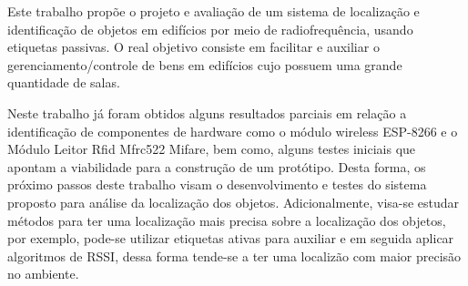 
\label{chapter:consideracoes}

Este trabalho propõe o projeto e avaliação de um sistema de localização e identificação de objetos em edifícios por meio de 
radiofrequência, usando etiquetas passivas. O real objetivo consiste em facilitar e auxiliar o gerenciamento/controle de 
bens em edifícios cujo possuem uma grande quantidade de salas.

Neste trabalho já foram obtidos alguns resultados parciais em relação a identificação de componentes de hardware como o módulo wireless 
ESP-8266 e o Módulo Leitor Rfid Mfrc522 Mifare, bem como, alguns testes iniciais que apontam a viabilidade para a construção de um 
protótipo. Desta forma, os próximo passos deste trabalho visam o desenvolvimento e testes do sistema proposto para análise da 
localização dos objetos. Adicionalmente, visa-se estudar métodos para ter uma localização mais precisa sobre a localização dos 
objetos, por exemplo, pode-se utilizar etiquetas ativas para auxiliar e em seguida aplicar algoritmos de RSSI, dessa forma 
tende-se a ter uma localizão com maior precisão no ambiente.
